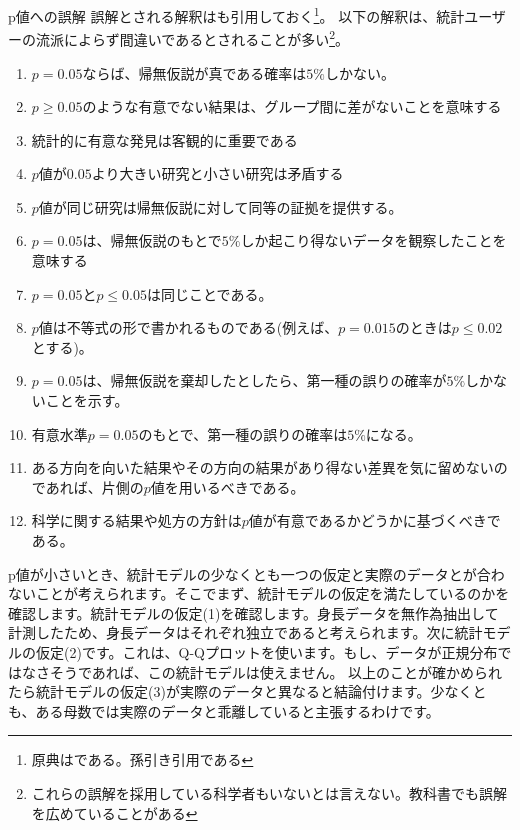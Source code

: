 \begin{SMbox}{p値への誤解}
    誤解とされる解釈はも引用しておく\cite{idiot_statistics2014}\footnote{原典は\cite{GOODMAN2008135}である。孫引き引用である}。
    以下の解釈は、統計ユーザーの流派によらず間違いであるとされることが多い\footnote{これらの誤解を採用している科学者もいないとは言えない。教科書でも誤解を広めていることがある}。
    \begin{enumerate}
        \item $p=0.05$ならば、帰無仮説が真である確率は$5\%$しかない。
        \item $p\geq 0.05$のような有意でない結果は、グループ間に差がないことを意味する
        \item 統計的に有意な発見は客観的に重要である
        \item $p$値が$0.05$より大きい研究と小さい研究は矛盾する
        \item $p$値が同じ研究は帰無仮説に対して同等の証拠を提供する。
        \item $p=0.05$は、帰無仮説のもとで$5\%$しか起こり得ないデータを観察したことを意味する
        \item $p=0.05$と$p\leq 0.05$は同じことである。
        \item $p$値は不等式の形で書かれるものである(例えば、$p=0.015$のときは$p\leq 0.02$とする)。
        \item $p=0.05$は、帰無仮説を棄却したとしたら、第一種の誤りの確率が$5\%$しかないことを示す。
        \item 有意水準$p=0.05$のもとで、第一種の誤りの確率は$5\%$になる。
        \item ある方向を向いた結果やその方向の結果があり得ない差異を気に留めないのであれば、片側の$p$値を用いるべきである。
        \item 科学に関する結果や処方の方針は$p$値が有意であるかどうかに基づくべきである。
    \end{enumerate}
\end{SMbox}




p値が小さいとき、統計モデルの少なくとも一つの仮定と実際のデータとが合わないことが考えられます。そこでまず、統計モデルの仮定を満たしているのかを確認します。統計モデルの仮定(1)を確認します。身長データを無作為抽出して計測したため、身長データはそれぞれ独立であると考えられます。次に統計モデルの仮定(2)です。これは、Q-Qプロットを使います。もし、データが正規分布ではなさそうであれば、この統計モデルは使えません。
以上のことが確かめられたら統計モデルの仮定(3)が実際のデータと異なると結論付けます。少なくとも、ある母数では実際のデータと乖離していると主張するわけです。
\fi



